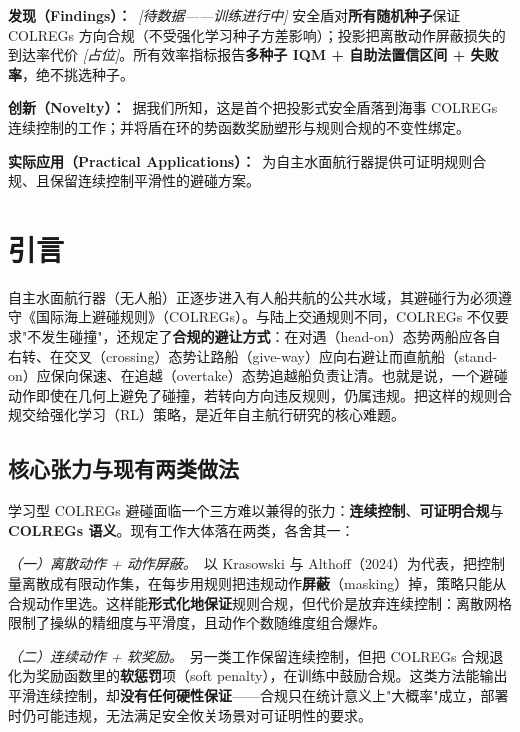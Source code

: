 \documentclass[12pt,letterpaper]{article}
\newcommand{\abshead}[1]{\textbf{#1}\ }
\begin{document}
\abshead{发现（Findings）：}\textit{[待数据——训练进行中]} 安全盾对\textbf{所有随机种子}保证 COLREGs 方向合规（不受强化学习种子方差影响）；投影把离散动作屏蔽损失的到达率代价 \textit{[占位]}。所有效率指标报告\textbf{多种子 IQM + 自助法置信区间 + 失败率}，绝不挑选种子。

\abshead{创新（Novelty）：}据我们所知，这是首个把投影式安全盾落到海事 COLREGs 连续控制的工作；并将盾在环的势函数奖励塑形与规则合规的不变性绑定。

\abshead{实际应用（Practical Applications）：}为自主水面航行器提供可证明规则合规、且保留连续控制平滑性的避碰方案。

\RaggedRight

\section{引言}
自主水面航行器（无人船）正逐步进入有人船共航的公共水域，其避碰行为必须遵守《国际海上避碰规则》（COLREGs）。与陆上交通规则不同，COLREGs 不仅要求"不发生碰撞"，还规定了\textbf{合规的避让方式}：在对遇（head-on）态势两船应各自右转、在交叉（crossing）态势让路船（give-way）应向右避让而直航船（stand-on）应保向保速、在追越（overtake）态势追越船负责让清。也就是说，一个避碰动作即使在几何上避免了碰撞，若转向方向违反规则，仍属违规。把这样的规则合规交给强化学习（RL）策略，是近年自主航行研究的核心难题。

\subsection{核心张力与现有两类做法}
学习型 COLREGs 避碰面临一个三方难以兼得的张力：\textbf{连续控制}、\textbf{可证明合规}与 \textbf{COLREGs 语义}。现有工作大体落在两类，各舍其一：

\textit{（一）离散动作 + 动作屏蔽。}\ 以 Krasowski 与 Althoff（2024）为代表，把控制量离散成有限动作集，在每步用规则把违规动作\textbf{屏蔽}（masking）掉，策略只能从合规动作里选。这样能\textbf{形式化地保证}规则合规，但代价是放弃连续控制：离散网格限制了操纵的精细度与平滑度，且动作个数随维度组合爆炸。

\textit{（二）连续动作 + 软奖励。}\ 另一类工作保留连续控制，但把 COLREGs 合规退化为奖励函数里的\textbf{软惩罚}项（soft penalty），在训练中鼓励合规。这类方法能输出平滑连续控制，却\textbf{没有任何硬性保证}——合规只在统计意义上"大概率"成立，部署时仍可能违规，无法满足安全攸关场景对可证明性的要求。
\end{document}
